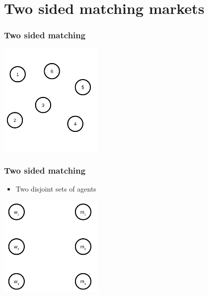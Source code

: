 \section{Two sided matching markets}
\newcommand\tab[1][1cm]{\hspace*{#1}}


\begin{frame}
\frametitle{Two sided matching}
\centering
\includegraphics[width=5cm]{img/intro/agents.png}
\end{frame}

\begin{frame} 
\frametitle{Two sided matching}
\begin{itemize}
    \item Two disjoint sets of agents
\end{itemize}

\centering
\includegraphics[width=5cm]{img/matching/twosided.png}
\end{frame}


